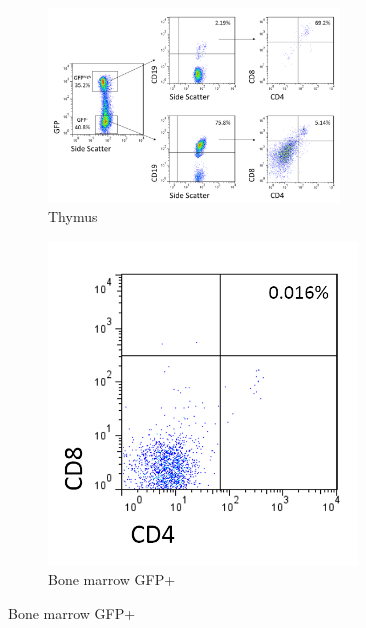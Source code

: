 \begin{figure}	
	\begin{subfigure}{\textwidth}
	\centering
	\includegraphics[width=0.85\textwidth]{Figures/GFPCD19CD4CD8.png}
	\caption{Thymus}
	\label{subfig:ThyRAGCD19DP}
	\end{subfigure}
	\begin{subfigure}{0.3\textwidth}
	\centering
	\includegraphics[width=0.9\textwidth]{Figures/BMallposGFPpos.png}
	\caption{Bone marrow GFP+}
	\label{subfig:BMRAGCD19DP}
	\end{subfigure}
	\hfill

\end{figure}
